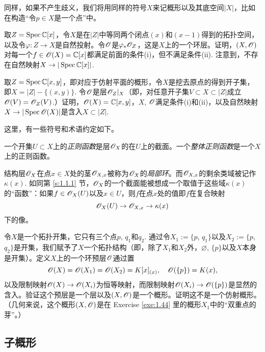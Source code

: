 同样，如果不产生歧义，我们将用同样的符号$X$来记概形以及其底空间$|X|$，比如在构造“令$p\in X$是一个点”中。

\begin{exe}
\begin{compactenum}[(a)]
\item 取$Z=\operatorname{Spec} \mathbb{C}[x]$，令$X$是在$|Z|$中等同两个闭点$(x)$和$(x-1)$得到的拓扑空间，以及令$\varphi:Z\to X$是自然投射。令$\mathscr{O}$是$\varphi_* \mathscr{O}_Z$，这是$X$上的一个环层。证明，$(X,\mathscr{O})$对每一个$f\in\mathscr{O}(X)=\mathbb{C}[x]$都满足前面的条件(i)，但不满足条件(ii). 注意到，不存在自然映射$X\to |\operatorname{Spec}\mathbb{C}[x]|$.
\item 取$Z=\operatorname{Spec} \mathbb{C}[x,y]$，即对应于仿射平面的概形，令$X$是挖去原点的得到开子集，即$X=|Z|-\{(x,y)\}$. 令$\mathscr{O}$是层$\mathscr{O}_Z|_X$（即，对任意开子集$V\subset X\subset |Z|$成立$\mathscr{O}(V)=\mathscr{O}_Z(V)$.）证明，$\mathscr{O}(X)=\mathbb{C}[x,y]$，$X$, $\mathscr{O}$满足条件(i)和(ii)，以及自然映射$X\to |\operatorname{Spec}\mathscr{O}(X)|$是含入$X\subset |Z|$.
\end{compactenum}
\end{exe}

这里，有一些符号和术语约定如下。

一个开集$U\subset X$上的\textit{正则函数}是层$\mathscr{O}_X$的在$U$上的截面。一个\textit{整体正则函数}是一个$X$上的正则函数。

结构层$\mathscr{O}_X$在点$x\in X$处的茎$\mathscr{O}_{X,x}$被称为$\mathscr{O}_X$的\textit{局部环}。而$\mathscr{O}_{X,x}$的剩余类域被记作$\kappa(x)$. 如同第 \ref{s:1.1.1} 节，$\mathscr{O}_X$的一个截面能被想成一个取值于这些域$\kappa(x)$的“函数”：如果$f\in\mathscr{O}_X(U)$以及$x\in U$，则$f$在点$x$处的值即$f$在复合映射
\[
	\mathscr{O}_X(U)\to \mathscr{O}_{X,x}\to \kappa(x)
\]
下的像。

\begin{exe}[最小的非仿射概形]
令$X$是一个拓扑开集，它只有三个点$p$, $q_1$和$q_2$. 通过令$X_1:=\{p$, $q_1\}$以及$X_2:=\{p$, $q_2\}$是开集，我们赋予了$X$一个拓扑结构（即，除了$X_1$和$X_2$外，$\varnothing$, $\{p\}$以及$X$本身是开集）。定义$X$上的一个环预层$\mathscr{O}$通过置
\[
	\mathscr{O}(X)=\mathscr{O}(X_1)=\mathscr{O}(X_2)=K[x]_{(x)},\quad \mathscr{O}(\{p\})=K(x),
\]
以及限制映射$\mathscr{O}(X)\to \mathscr{O}(X_i)$为恒等映射，而限制映射$\mathscr{O}(X_i)\to \mathscr{O}(\{p\})$是显然的含入。验证这个预层是一个层以及$(X,\mathscr{O})$是一个概形。证明这不是一个仿射概形。（几何来说，这个概形$(X,\mathscr{O})$是在 Exercise \ref{exe:1.44}  里的概形$X_1$中的“双重点的芽”。）
\end{exe}

\subsection{子概形} \label{s:1.2.1}

